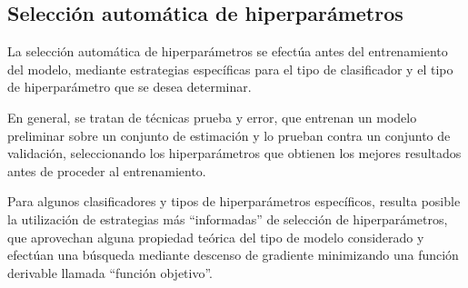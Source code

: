%
%
\subsection{Selección automática de hiperparámetros}
%
La selección automática de hiperparámetros se efectúa antes del
entrenamiento del modelo, mediante estrategias específicas para el
tipo de clasificador y el tipo de hiperparámetro que se desea
determinar.

En general, se tratan de técnicas prueba y error, que entrenan un
modelo preliminar sobre un conjunto de estimación y lo prueban contra
un conjunto de validación, seleccionando los hiperparámetros que
obtienen los mejores resultados antes de proceder al entrenamiento.

Para algunos clasificadores y tipos de hiperparámetros específicos,
resulta posible la utilización de estrategias más ``informadas'' de
selección de hiperparámetros, que aprovechan alguna propiedad teórica
del tipo de modelo considerado y efectúan una búsqueda mediante
descenso de gradiente minimizando una función derivable llamada
``función objetivo''.
